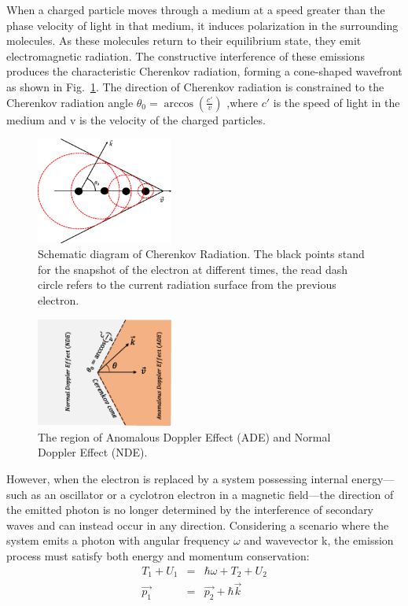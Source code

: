 \documentclass{cpbtex}
\begin{document}
\begin{CJK*}{GBK}{song}
When a charged particle moves through a medium at a speed greater than the phase velocity of light in that medium, it induces polarization in the surrounding molecules. As these molecules return to their equilibrium state, they emit electromagnetic radiation. The constructive interference of these emissions produces the characteristic Cherenkov radiation, forming a cone-shaped wavefront as shown in Fig.~\ref{fig:cherenkov}. The direction of Cherenkov radiation is constrained to the Cherenkov radiation angle $\theta_0 = \arccos\left(\frac{c'}{v}\right)$
,where $ c'$ is the speed of light in the medium and v is the velocity of the charged particles.
\begin{figure}
\centering
\includegraphics[width=0.4\textwidth]{Figure1.eps}%
\caption{\label{fig:cherenkov}Schematic diagram of Cherenkov Radiation. The black points stand for the snapshot of the electron at different times, the read dash circle refers to the current radiation surface from the previous electron.}
\end{figure}
\begin{figure}
\centering
\includegraphics[width=0.4\textwidth]{Figure2.eps}%
\caption{\label{fig:ADENDE}The region of Anomalous Doppler Effect (ADE) and Normal Doppler Effect (NDE).}
\end{figure}

However, when the electron is replaced by a system possessing internal energy---such as an oscillator or a cyclotron electron in a magnetic field---the direction of the emitted photon is no longer determined by the interference of secondary waves and can instead occur in any direction. Considering a scenario where the system emits a photon with angular frequency $\omega$ and wavevector k, the emission process must satisfy both energy and momentum conservation:
\begin{subequations}
\begin{eqnarray}
T_1+U_1&=&\hbar \omega +T_2+U_2  \label{Tc} \\  
 \vec{p_1}&=&\vec{p_2}+\hbar\vec{k}   \label{Pc}
\end{eqnarray}
\end{subequations}


\end{CJK*}
\end{document}
